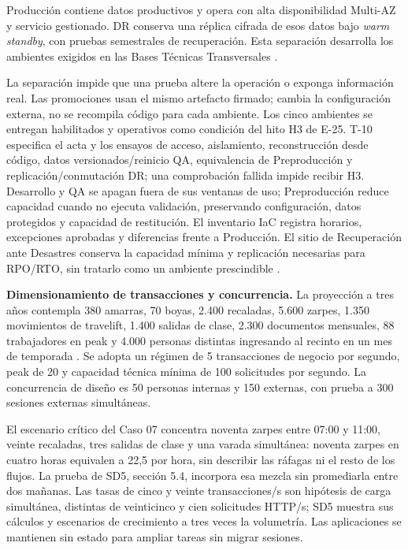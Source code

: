 Producción contiene datos productivos y opera con alta disponibilidad Multi-AZ y servicio gestionado. DR conserva una réplica cifrada de esos datos bajo \emph{warm standby}, con pruebas semestrales de recuperación. Esta separación desarrolla los ambientes exigidos en las Bases Técnicas Transversales \parencite[cap.~4, pp.~10--11]{pucv-transversal}.

La separación impide que una prueba altere la operación o exponga información real. Las promociones usan el mismo artefacto firmado; cambia la configuración externa, no se recompila código para cada ambiente. Los cinco ambientes se entregan habilitados y operativos como condición del hito H3 de E-25. T-10 especifica el acta y los ensayos de acceso, aislamiento, reconstrucción desde código, datos versionados/reinicio QA, equivalencia de Preproducción y replicación/conmutación DR; una comprobación fallida impide recibir H3. Desarrollo y QA se apagan fuera de sus ventanas de uso; Preproducción reduce capacidad cuando no ejecuta validación, preservando configuración, datos protegidos y capacidad de restitución. El inventario IaC registra horarios, excepciones aprobadas y diferencias frente a Producción. El sitio de Recuperación ante Desastres conserva la capacidad mínima y replicación necesarias para RPO/RTO, sin tratarlo como un ambiente prescindible \parencite[RT-04.01, p.~10; RT-15.02, p.~27]{pucv-transversal}.

\textbf{Dimensionamiento de transacciones y concurrencia.} La proyección a tres años contempla 380 amarras, 70 boyas, 2.400 recaladas, 5.600 zarpes, 1.350 movimientos de travelift, 1.400 salidas de clase, 2.300 documentos mensuales, 88 trabajadores en peak y 4.000 personas distintas ingresando al recinto en un mes de temporada \parencite[cap. 14, sec. 14.1]{caso07}. Se adopta un régimen de 5 transacciones de negocio por segundo, peak de 20 y capacidad técnica mínima de 100 solicitudes por segundo. La concurrencia de diseño es 50 personas internas y 150 externas, con prueba a 300 sesiones externas simultáneas.

El escenario crítico del Caso 07 concentra noventa zarpes entre 07:00 y 11:00, veinte recaladas, tres salidas de clase y una varada simultánea: noventa zarpes en cuatro horas equivalen a 22,5 por hora, sin describir las ráfagas ni el resto de los flujos. La prueba de SD5, sección 5.4, incorpora esa mezcla sin promediarla entre dos mañanas. Las tasas de cinco y veinte transacciones/s son hipótesis de carga simultánea, distintas de veinticinco y cien solicitudes HTTP/s; SD5 muestra sus cálculos y escenarios de crecimiento a tres veces la volumetría. Las aplicaciones se mantienen sin estado para ampliar tareas sin migrar sesiones.

